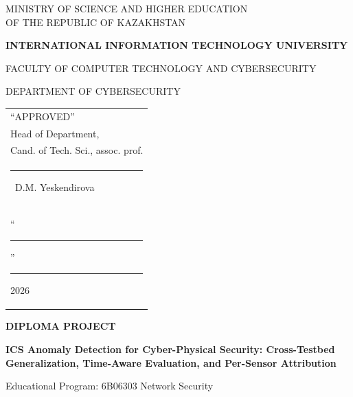 \thispagestyle{empty}
\setcounter{page}{1}

\begin{center}
{\fontsize{14pt}{18pt}\selectfont MINISTRY OF SCIENCE AND HIGHER EDUCATION\\ OF THE REPUBLIC OF KAZAKHSTAN\par}
\vspace{0.2cm}
{\fontsize{14pt}{18pt}\selectfont \textbf{INTERNATIONAL INFORMATION TECHNOLOGY UNIVERSITY}\par}
\vspace{0.2cm}
{\fontsize{14pt}{18pt}\selectfont FACULTY OF COMPUTER TECHNOLOGY AND CYBERSECURITY\par}
\vspace{0.2cm}
{\fontsize{14pt}{18pt}\selectfont DEPARTMENT OF CYBERSECURITY\par}
\end{center}

\vspace{0.5cm}

\begin{flushright}
\begin{tabular}{l}
``APPROVED''\\
Head of Department,\\
Cand. of Tech. Sci., assoc. prof.\\[0.2cm]
\rule{4cm}{0.4pt}~D.M. Yeskendirova\\[0.2cm]
``\rule{1cm}{0.4pt}'' \rule{2cm}{0.4pt} 2026\\
\end{tabular}
\end{flushright}

\vspace{2cm}

\begin{center}
{\fontsize{16pt}{20pt}\selectfont \textbf{DIPLOMA PROJECT}\par}
\vspace{0.6cm}
{\fontsize{14pt}{18pt}\selectfont \textbf{ICS Anomaly Detection for Cyber-Physical Security: Cross-Testbed Generalization, Time-Aware Evaluation, and Per-Sensor Attribution}\par}
\vspace{0.6cm}
{\fontsize{14pt}{18pt}\selectfont Educational Program: 6B06303 Network Security\par}
\end{center}

